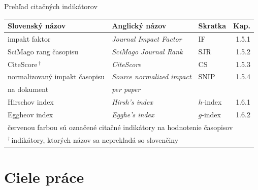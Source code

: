 \documentclass{beamer}
\begin{document}
%
%
\begin{frame}{Prehľad citačných indikátorov}
  \begin{table}
    \footnotesize
    \begin{tabular}{lllr}
      \toprule
      Slovenský názov & Anglický názov & Skratka & Kap. \\
      \midrule
      \rowcolor{LRed} impakt faktor                 & \emph{Journal Impact Factor}    & IF        & 1.5.1 \\[0.5ex]
      \rowcolor{LRed} SciMago rang časopisu         & \emph{SciMago Journal Rank}     & SJR       & 1.5.2 \\[0.5ex]
      \rowcolor{LRed} CiteScore\,$^\dagger$            & \emph{CiteScore}                & CS        & 1.5.3 \\[0.5ex]
      \rowcolor{LRed} normalizovaný impakt časopisu & \emph{Source normalized impact} & SNIP      & 1.5.4 \\[-0.25ex]
      \rowcolor{LRed} na dokument                   & \emph{per paper}                &           &       \\[0.5ex]
      Hirschov index                                & \emph{Hirsh's index}            & $h$-index & 1.6.1 \\[1.5ex]
      Eggheov index                                 & \emph{Egghe's index}            & $g$-index & 1.6.2 \\[0.5ex]
      \bottomrule
      \multicolumn{4}{l}{\tiny {\color{red} červenou farbou} sú označené citačné indikátory na hodnotenie časopisov} \\
      \multicolumn{4}{l}{\tiny $^\dagger$\,indikátory, ktorých názov sa neprekladá so slovenčiny}
    \end{tabular}
  \end{table}
\end{frame}


\section{Ciele práce}
\end{document}

